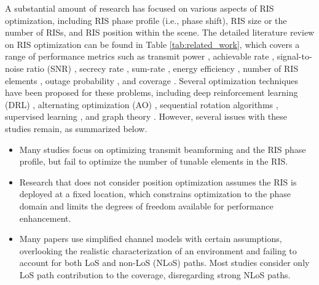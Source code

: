 \documentclass{IEEEoj}
\begin{document}
A substantial amount of research has focused on various aspects of RIS optimization, including RIS phase profile (i.e., phase shift), RIS size or the number of RISs, and RIS position within the scene. The detailed literature review on RIS optimization can be found in Table \ref{tab:related_work}, which covers a range of performance metrics such as transmit power \cite{Wu2019,Wu2019-2,Bai2024-1}, achievable rate \cite{Abeywickrama2020,DRL1,OptimalRISSize,Zhou2021-1}, signal-to-noise ratio (SNR) \cite{DRL2,Feng2025-1,Feng2023-1,Lu2021-1}, secrecy rate \cite{SecureRIS,Bai2022-1,Guo2023-1}, sum-rate \cite{MultiUserRISSize,Shang2023-1,Nguyen2022-1, Gu2023-1, Nguyen-Kha2022-1, Ge2021-1,Saqib2023-1,Saqib2023-2}, energy efficiency \cite{OptimalRISSize,Aung2024-1}, number of RIS elements \cite{MultiUserRISSize,Li2022-1}, outage probability \cite{Qin2022-1,Efrem2023-1}, and coverage \cite{RISOrientationOptimization,Rani2024-1,Cheng2022-1,Liu2024-1,Zhang2022-1,Mei2023-1,Mei2023-2,Hou2022-1,Saqib2023-1,Saqib2023-2}. Several optimization techniques have been proposed for these problems, including deep reinforcement learning (DRL) \cite{DRL1,DRL2,Aung2024-1,Naeem2023-1}, alternating optimization (AO) \cite{Abeywickrama2020,Nguyen2022-1, Gu2023-1, Nguyen-Kha2022-1, Ge2021-1,Feng2025-1}, sequential rotation algorithms \cite{Wang2020}, supervised learning \cite{Hou2022-1}, and graph theory \cite{Mei2023-1,Mei2023-2}. However, several issues with these studies remain, as summarized below.
\begin{itemize}
	\item Many studies focus on optimizing transmit beamforming and the RIS phase profile, but fail to optimize the number of tunable elements in the RIS.
	\item Research that does not consider position optimization assumes the RIS is deployed at a fixed location, which constrains optimization to the phase domain and limits the degrees of freedom available for performance enhancement.
	\item Many papers use simplified channel models with certain assumptions, overlooking the realistic characterization of an environment and failing to account for both LoS and non-LoS (NLoS) paths. Most studies consider only LoS path contribution to the coverage, disregarding strong NLoS paths.
\end{itemize}
\end{document}
